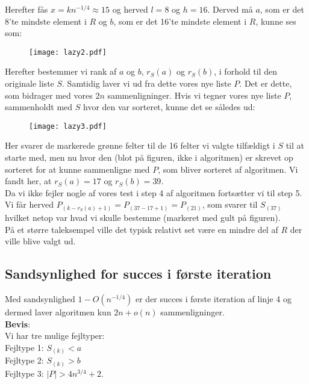 Herefter fås $x = kn^{-1/4} \approx 15$ og herved $l = 8$ og $h = 16$. Derved må $a$, som er det 8'te mindste element i $R$ og $b$, som er det 16'te mindste element i $R$, kunne ses som:
\begin{figure}[H]
  \begin{center}
  \texttt{[image: lazy2.pdf]}
  \end{center}
  \label{fig:lazy2}
\end{figure}

Herefter bestemmer vi rank af $a$ og $b$, $r_S(a)$ og $r_S(b)$, i forhold til den originale liste $S$. Samtidig laver vi ud fra dette vores nye liste $P$. Det er dette, som bidrager med vores $2n$ sammenligninger. Hvis vi tegner vores nye liste $P$, sammenholdt med $S$ hvor den var sorteret, kunne det se således ud:
\begin{figure}[H]
  \begin{center}
  \texttt{[image: lazy3.pdf]}
  \end{center}
  \label{fig:lazy3}
\end{figure}

Her svarer de markerede grønne felter til de 16 felter vi valgte tilfældigt i $S$ til at starte med, men nu hvor den (blot på figuren, ikke i algoritmen) er skrevet op sorteret for at kunne sammenligne med $P$, som bliver sorteret af algoritmen. Vi fandt her, at $r_S(a) = 17$ og $r_S(b) = 39$.\\

Da vi ikke fejler nogle af vores test i step 4 af algoritmen fortsætter vi til step 5. Vi får herved $P_{(k - r_S(a) + 1)} = P_{(37 - 17 + 1)} = P_{(21)}$, som svarer til $S_{(37)}$ hvilket netop var hvad vi skulle bestemme (markeret med gult på figuren).\\

På et større taleksempel ville det typisk relativt set være en mindre del af $R$ der ville blive valgt ud.



\subsection{Sandsynlighed for succes i første iteration}
Med sandsynlighed $1 - O(n^{-1/4})$ er der succes i første iteration af linje 4 og dermed laver algoritmen kun $2n + o(n)$ sammenligninger.\\

\textbf{Bevis}:\\
Vi har tre mulige fejltyper:\\
Fejltype 1: $S_{(k)} < a$\\
Fejltype 2: $S_{(k)} > b$\\
Fejltype 3: $|P| > 4 n^{3/4} + 2$.\\\\

